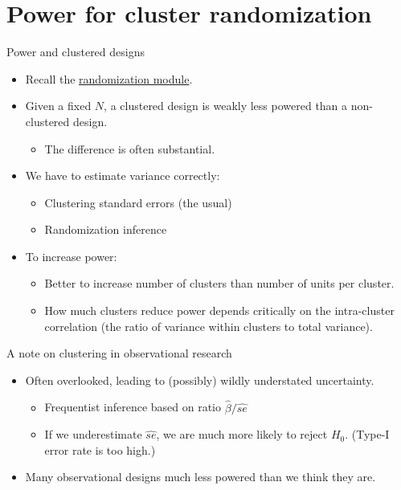 \documentclass[
  ignorenonframetext,
]{beamer}
\providecommand{\tightlist}{%
  \setlength{\itemsep}{0pt}\setlength{\parskip}{0pt}}
\begin{document}
\hypertarget{power-for-cluster-randomization}{%
\section{Power for cluster
randomization}\label{power-for-cluster-randomization}}

\begin{frame}{Power and clustered designs}
\protect\hypertarget{power-and-clustered-designs}{}
\begin{itemize}
\item
  Recall the \href{randomization.html}{randomization module}.
\item
  Given a fixed \(N\), a clustered design is weakly less powered than a
  non-clustered design.

  \begin{itemize}
  \tightlist
  \item
    The difference is often substantial.
  \end{itemize}
\item
  We have to estimate variance correctly:

  \begin{itemize}
  \tightlist
  \item
    Clustering standard errors (the usual)
  \item
    Randomization inference
  \end{itemize}
\item
  To increase power:

  \begin{itemize}
  \tightlist
  \item
    Better to increase number of clusters than number of units per
    cluster.
  \item
    How much clusters reduce power depends critically on the
    intra-cluster correlation (the ratio of variance within clusters to
    total variance).
  \end{itemize}
\end{itemize}
\end{frame}

\begin{frame}{A note on clustering in observational research}
\protect\hypertarget{a-note-on-clustering-in-observational-research}{}
\begin{itemize}
\item
  Often overlooked, leading to (possibly) wildly understated
  uncertainty.

  \begin{itemize}
  \item
    Frequentist inference based on ratio \(\hat{\beta}/\hat{se}\)
  \item
    If we underestimate \(\hat{se}\), we are much more likely to reject
    \(H_0\). (Type-I error rate is too high.)
  \end{itemize}
\item
  Many observational designs much less powered than we think they are.
\end{itemize}
\end{frame}
\end{document}
